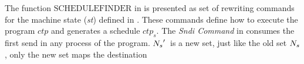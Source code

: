 The function $\mathrm{SCHEDULEFINDER}$ in  is presented as set of rewriting commands for the machine state (\textit{st}) defined in . These commands define how to execute the program $\mathit{ctp}$ and generates a schedule $\mathit{ctp}_s$. The \emph{Sndi Command} in  consumes the first send in any process of the program. 
$\textit{$N_s$}^\prime$\ is a new set, just like the old set $\textit{$N_s$}$, only the new set maps the destination
